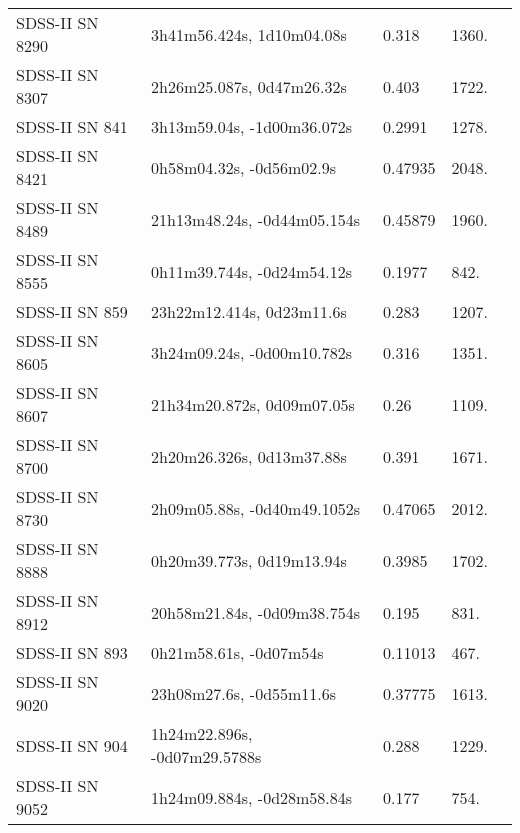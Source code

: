 \begin{longtable}{lllll}
  SDSS-II SN 8290 &      3h41m56.424s, 1d10m04.08s &    0.318 &          1360. &    \citet{2011ApJ...738..162S} \\
  SDSS-II SN 8307 &      2h26m25.087s, 0d47m26.32s &    0.403 &          1722. &    \citet{2005ApJS..158..161H} \\
   SDSS-II SN 841 &     3h13m59.04s, -1d00m36.072s &   0.2991 &          1278. &    \citet{2011ApJ...738..162S} \\
  SDSS-II SN 8421 &       0h58m04.32s, -0d56m02.9s &  0.47935 &          2048. &    \citet{2016SDSSD.C...0000:} \\
  SDSS-II SN 8489 &    21h13m48.24s, -0d44m05.154s &  0.45879 &          1960. &    \citet{2016SDSSD.C...0000:} \\
  SDSS-II SN 8555 &     0h11m39.744s, -0d24m54.12s &   0.1977 &           842. &    \citet{2011ApJ...738..162S} \\
   SDSS-II SN 859 &      23h22m12.414s, 0d23m11.6s &    0.283 &          1207. &    \citet{2005ApJS..158..161H} \\
  SDSS-II SN 8605 &     3h24m09.24s, -0d00m10.782s &    0.316 &          1351. &    \citet{2011ApJ...738..162S} \\
  SDSS-II SN 8607 &     21h34m20.872s, 0d09m07.05s &     0.26 &          1109. &    \citet{2011ApJ...738..162S} \\
  SDSS-II SN 8700 &      2h20m26.326s, 0d13m37.88s &    0.391 &          1671. &    \citet{2011ApJ...738..162S} \\
  SDSS-II SN 8730 &    2h09m05.88s, -0d40m49.1052s &  0.47065 &          2012. &    \citet{2016SDSSD.C...0000:} \\
  SDSS-II SN 8888 &      0h20m39.773s, 0d19m13.94s &   0.3985 &          1702. &    \citet{2011ApJ...738..162S} \\
  SDSS-II SN 8912 &    20h58m21.84s, -0d09m38.754s &    0.195 &           831. &    \citet{2011ApJ...738..162S} \\
   SDSS-II SN 893 &         0h21m58.61s, -0d07m54s &  0.11013 &           467. &    \citet{2016SDSSD.C...0000:} \\
  SDSS-II SN 9020 &       23h08m27.6s, -0d55m11.6s &  0.37775 &          1613. &    \citet{2016SDSSD.C...0000:} \\
   SDSS-II SN 904 &   1h24m22.896s, -0d07m29.5788s &    0.288 &          1229. &    \citet{2011ApJ...738..162S} \\
  SDSS-II SN 9052 &     1h24m09.884s, -0d28m58.84s &    0.177 &           754. &    \citet{2011ApJ...738..162S} \\

\end{longtable}
